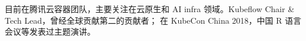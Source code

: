 

\begin{cvparagraph}
\begin{minipage}[t]{\textwidth}
目前在腾讯云容器团队，主要关注在云原生和 AI infra 领域。Kubeflow Chair \& Tech Lead，曾经全球贡献第二的贡献者；
在 KubeCon China 2018，中国 R 语言会议等发表过主题演讲。
\end{minipage}
\end{cvparagraph}
